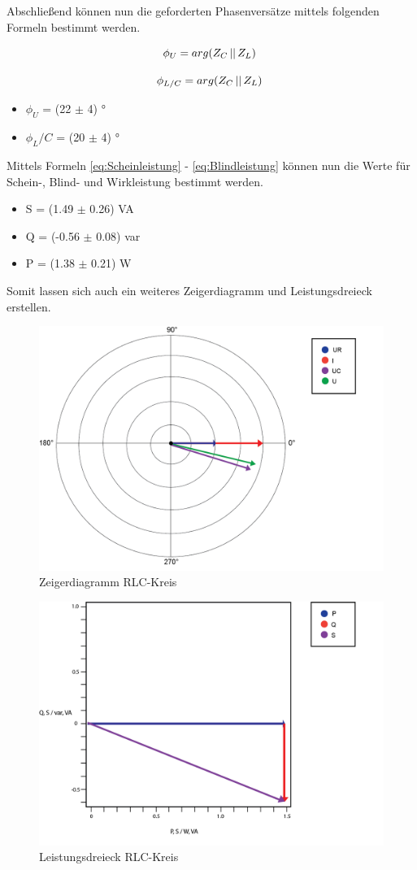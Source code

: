 \documentclass[12pt,a4paper,twoside]{article}
\begin{document}
\noindent
Abschließend können nun die geforderten Phasenversätze mittels folgenden Formeln bestimmt werden.

\begin{equation}
    \label{eq:PhvU}
    \centerline{$\phi_U = arg(Z_C \left\lvert\right\rvert Z_L)$ }
\end{equation}

\begin{equation}
    \label{eq:PhvL/C}
    \centerline{$\phi_{L/C} = arg(Z_C \left\lvert\right\rvert Z_L)$ }
\end{equation}

\begin{itemize}
    \item $\phi_U$ = (22 $\pm$ 4) °
    \item $\phi_L/C$ = (20 $\pm$ 4) °
\end{itemize}

\noindent
Mittels Formeln \ref{eq:Scheinleistung} - \ref{eq:Blindleistung} können nun die Werte für Schein-, Blind- und Wirkleistung bestimmt werden.

\begin{itemize}
    \item S = (1.49 $\pm$ 0.26) VA
    \item Q = (-0.56 $\pm$ 0.08) var
    \item P = (1.38 $\pm$ 0.21) W
\end{itemize}

\noindent
Somit lassen sich auch ein weiteres Zeigerdiagramm und Leistungsdreieck erstellen.

\begin{figure}[H]
    \centering
    \includegraphics[width=0.6\linewidth]{nudes/Phasendiagramm7.png}
    \caption{Zeigerdiagramm RLC-Kreis}
    \label{fig:ZeigerdiagrammRLC}
\end{figure}

\begin{figure}[H]
    \centering
    \includegraphics[width=0.6\linewidth]{nudes/Leistungsdreieck7.png}
    \caption{Leistungsdreieck RLC-Kreis}
    \label{fig:LeistungsdreieckRLC}
\end{figure}
\end{document}
